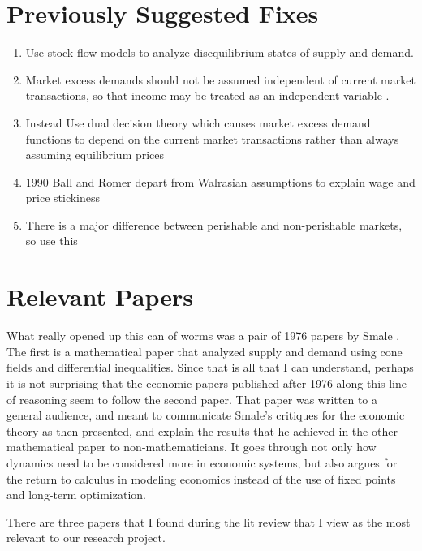 \documentclass{article}
\begin{document}
\section{Previously Suggested Fixes}\label{fixes}
\begin{enumerate}
	\item Use stock-flow models to analyze disequilibrium states of supply and demand\cite{clower_keynesian_1984}.
	\item Market excess demands should not be assumed independent of current market transactions, so that income may be treated as an independent variable \cite{clower_keynesian_1984}.
	\item Instead Use dual decision theory which causes market excess demand functions to depend on the current market transactions rather than always assuming equilibrium prices \cite{clower_keynesian_1984}
	\item 1990 Ball and Romer depart from Walrasian assumptions to explain wage and price stickiness \cite{ball_real_1990}
	\item There is a major difference between perishable and non-perishable markets, so use this \cite{smale_dynamics_1976}
\end{enumerate}

\section{Relevant Papers}
What really opened up this can of worms was a pair of 1976 papers by Smale \cite{smale_exchange_1976, smale_dynamics_1976}. The first is a mathematical paper that analyzed supply and demand using cone fields and differential inequalities. Since that is all that I can understand, perhaps it is not surprising that the economic papers published after 1976 along this line of reasoning seem to follow the second paper. That paper was written to a general audience, and meant to communicate Smale's critiques for the economic theory as then presented, and explain the results that he achieved in the other mathematical paper to non-mathematicians. It goes through not only how dynamics need to be considered more in economic systems, but also argues for the return to calculus in modeling economics instead of the use of fixed points and long-term optimization. 

There are three papers that I found during the lit review that I view as the most relevant to our research project. 
\end{document}
